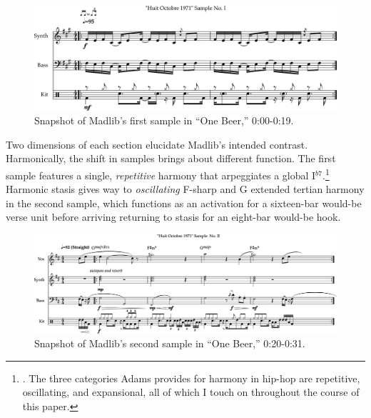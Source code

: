     \begin{figure}[ht]
        \centering
        \includegraphics[width=\textwidth]{images/figures/chp 02/000019onebeerintro.pdf}
        \caption{Snapshot of Madlib's first sample in ``One Beer,'' 0:00-0:19.}
        \label{fig:onebeerintro}
    \end{figure}

Two dimensions of each section elucidate Madlib's intended contrast. Harmonically, the shift in samples brings about different function. The first sample features a single, \emph{repetitive} harmony that arpeggiates a global I$^{b7}$.\footnote{\cite{kyleadamsHarmonicSyntacticMotivic2020}. The three categories Adams provides for harmony in hip-hop are repetitive, oscillating, and expansional, all of which I touch on throughout the course of this paper.} Harmonic stasis gives way to \emph{oscillating} F-sharp and G extended tertian harmony in the second sample, which functions as an activation for a sixteen-bar would-be verse unit before arriving returning to stasis for an eight-bar would-be hook.

    \begin{figure}[ht]
        \centering
        \includegraphics[width=\textwidth]{images/figures/chp 02/02031onebeermain.pdf}
        \caption{Snapshot of Madlib's second sample in ``One Beer,'' 0:20-0:31.}
        \label{fig:onebeermain}
    \end{figure}

